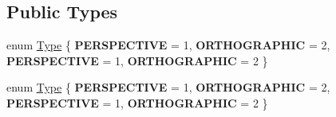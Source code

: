 \subsection*{Public Types}
\begin{DoxyCompactItemize}
\item 
enum \hyperlink{classCamera_a3b0a1f58deca679ac665f61c480d1dcb}{Type} \{ {\bfseries P\+E\+R\+S\+P\+E\+C\+T\+I\+VE} = 1, 
{\bfseries O\+R\+T\+H\+O\+G\+R\+A\+P\+H\+IC} = 2, 
{\bfseries P\+E\+R\+S\+P\+E\+C\+T\+I\+VE} = 1, 
{\bfseries O\+R\+T\+H\+O\+G\+R\+A\+P\+H\+IC} = 2
 \}
\item 
enum \hyperlink{classCamera_a3b0a1f58deca679ac665f61c480d1dcb}{Type} \{ {\bfseries P\+E\+R\+S\+P\+E\+C\+T\+I\+VE} = 1, 
{\bfseries O\+R\+T\+H\+O\+G\+R\+A\+P\+H\+IC} = 2, 
{\bfseries P\+E\+R\+S\+P\+E\+C\+T\+I\+VE} = 1, 
{\bfseries O\+R\+T\+H\+O\+G\+R\+A\+P\+H\+IC} = 2
 \}
\end{DoxyCompactItemize}
